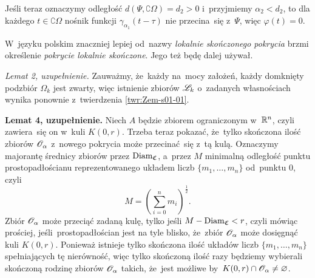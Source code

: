 \documentclass[a4paper,11pt]{article}
\begin{document}
Jeśli teraz oznaczymy odległość $d( \Psi, \complement \Omega ) = d_{ 2 } > 0$
i~przyjmiemy $\alpha_{ 2 } < d_{ 2 }$, to dla każdego $t \in \complement \Omega$
nośnik funkcji $\gamma_{ \alpha_{ 1 } }( t - \tau )$ nie przecina~się
z~$\Psi$, więc $\varphi( t ) = 0$.

\vspace{\spaceFour}



\start {} W~języku polskim znaczniej lepiej od~nazwy
\textit{lokalnie skończonego pokrycia} brzmi określenie \textit{pokrycie
  lokalnie skończone}. Jego też będę dalej używał.

\vspace{\spaceFour}



\start {} \textit{Lemat 2, uzupełnienie.} Zauważmy, że~każdy na~mocy
założeń, każdy domknięty podzbiór $\Omega_{ k }$ jest zwarty, więc
istnienie zbiorów $\mathcal{L}_{ k }$ o~zadanych własnościach wynika ponownie
z~twierdzenia \eqref{twr:Zem-s01-01}.

\vspace{\spaceFour}



\start {} \textbf{Lemat 4, uzupełnienie.} Niech $A$ będzie zbiorem
ograniczonym w~$\mathbb{R}^{ n }$, czyli zawiera~się on w~kuli $K( 0, r )$. Trzeba
teraz pokazać, że~tylko skończona ilość zbiorów $\mathcal{O}_{ \alpha }$ z~nowego
pokrycia może przecinać~się z~tą kulą. Oznaczymy majorantę średnicy
zbiorów przez $\textrm{Diam}_{ \mathfrak{C} }$, a~przez $M$ minimalną
odległość punktu prostopadłościanu reprezentowanego układem liczb
$\{ m_{ 1 }, \ldots, m_{ n } \}$ od~punktu $0$, czyli
\begin{equation}
  \label{eq:Zem-s01-06}
  M = \left( \sum_{ i = 0 }^{ n } m_{ i } \right)^{ \frac{ 1 }{ 2 } }.
\end{equation}
Zbiór $\mathcal{O}_{ \alpha }$ może przeciąć zadaną kulę, tylko jeśli
$M - \textrm{Diam}_{ \mathfrak{C} } < r$, czyli mówiąc prościej,
jeśli~prostopadłościan jest na tyle blisko, że~zbiór $\mathcal{O}_{ \alpha }$
może dosięgnąć kuli $K( 0, r )$. Ponieważ istnieje tylko skończona
ilość układów liczb $\{ m_{ 1 }, \ldots, m_{ n } \}$ spełniających tę
nierówność, więc tylko skończoną ilość razy będziemy wybierali
skończoną rodzinę zbiorów $\mathcal{O}_{ \alpha }$ takich, że~jest możliwe
by~$K( 0, r ) \cap \mathcal{O}_{ \alpha } \neq \varnothing$.

\vspace{\spaceFour}
\end{document}
